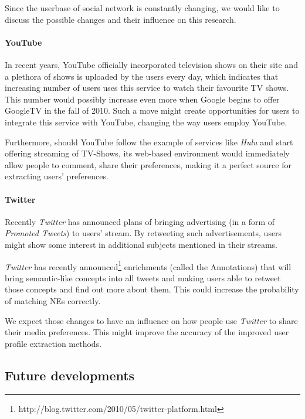Since the userbase of social network is constantly changing, we would like to
discuss the possible changes and their influence on this research.

\paragraph{YouTube}

In recent years, YouTube officially incorporated television shows on their
site \cite{youtube-tv-shows} and a plethora of shows is uploaded by the users
every day, which indicates that increasing number of users uses this service to
watch their favourite TV shows. This number would possibly increase even more
when Google begins to offer GoogleTV in the
fall of 2010. Such a move might create opportunities for users to integrate
this service with YouTube, changing the way users employ YouTube.

Furthermore, should YouTube follow the example of services like \textit{Hulu}
and start offering streaming of TV-Shows, its web-based environment would immediately
allow people to comment, share their preferences, making it a perfect source for extracting
users' preferences.

\paragraph{Twitter}

Recently \textit{Twitter} has announced plans of bringing advertising (\eg in a form of
\textit{Promoted Tweets}) to users' stream. By retweeting such advertisements,
users might show some interest in additional subjects mentioned in their
streams.

\textit{Twitter} has recently announced\footnote{http://blog.twitter.com/2010/05/twitter-platform.html}
enrichments (called the Annotations) that will bring semantic-like concepts
into all tweets and making users able to retweet those concepts and find
out more about them. This could increase the probability of matching NEs correctly.

We expect those changes to have an influence on how people use \textit{Twitter}
to share their media preferences. This might improve the accuracy of the improved
user profile extraction methods.

\subsection{Future developments}

